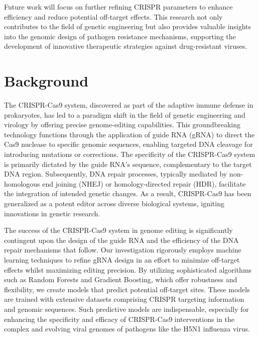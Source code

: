 \documentclass{article}
\begin{document}
Future work will focus on further refining CRISPR parameters to enhance efficiency and reduce potential off-target effects. This research not only contributes to the field of genetic engineering but also provides valuable insights into the genomic design of pathogen resistance mechanisms, supporting the development of innovative therapeutic strategies against drug-resistant viruses.

\section{Background}
The CRISPR-Cas9 system, discovered as part of the adaptive immune defense in prokaryotes, has led to a paradigm shift in the field of genetic engineering and virology by offering precise genome-editing capabilities. This groundbreaking technology functions through the application of guide RNA (gRNA) to direct the Cas9 nuclease to specific genomic sequences, enabling targeted DNA cleavage for introducing mutations or corrections. The specificity of the CRISPR-Cas9 system is primarily dictated by the guide RNA's sequence, complementary to the target DNA region. Subsequently, DNA repair processes, typically mediated by non-homologous end joining (NHEJ) or homology-directed repair (HDR), facilitate the integration of intended genetic changes. As a result, CRISPR-Cas9 has been generalized as a potent editor across diverse biological systems, igniting innovations in genetic research. 

The success of the CRISPR-Cas9 system in genome editing is significantly contingent upon the design of the guide RNA and the efficiency of the DNA repair mechanisms that follow. Our investigation rigorously employs machine learning techniques to refine gRNA design in an effort to minimize off-target effects whilst maximizing editing precision. By utilizing sophisticated algorithms such as Random Forests and Gradient Boosting, which offer robustness and flexibility, we create models that predict potential off-target sites. These models are trained with extensive datasets comprising CRISPR targeting information and genomic sequences. Such predictive models are indispensable, especially for enhancing the specificity and efficacy of CRISPR-Cas9 interventions in the complex and evolving viral genomes of pathogens like the H5N1 influenza virus.
\end{document}
